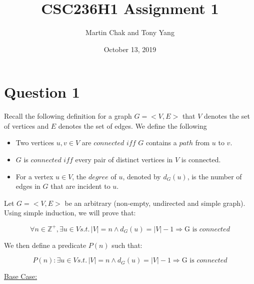 \documentclass[20pt]{article}
\title{CSC236H1 Assignment 1}
\author{Martin Chak and Tony Yang}
\date{October 13, 2019}
\begin{document}

\maketitle


\newpage

\section*{Question 1}

\begin{text}
    Recall the following definition for a graph $G = <V,E>$ that $V$ denotes the set of vertices and $E$ denotes the set of edges. We define the following
\end{text}

\begin{itemize}
    \item Two vertices $u,v \in V$ are $connected$ $iff$ $G$ contains a $path$ from $u$ to $v$.
    \item $G$ is $connected$ $iff$ every pair of distinct vertices in $V$ is connected.
    \item For a vertex $u \in V$, the $degree$ of $u$, denoted by $d_{G}(u)$, is the number of edges in $G$ that are incident to $u$.
\end{itemize}

\noindent 
\begin{text}
    Let $G = <V,E>$ be an arbitrary (non-empty, undirected and simple graph). Using simple induction, we will prove that:
\end{text}

\begin{equation}
    \forall n \in \mathbb{Z}^+, \exists u \in V s.t.\, |V| = n \land d_{G}(u) = |V| - 1 \Rightarrow \text{G is }connected \nonumber
\end{equation}

\noindent
\begin{text}
    We then define a predicate $P(n)$ such that:
\end{text}

\begin{equation}
    P(n): \exists u \in V s.t.\, |V| = n \land d_{G}(u) = |V| - 1 \Rightarrow \text{G is }connected \nonumber
\end{equation}

\noindent
\underline{Base Case:}
\end{document}
